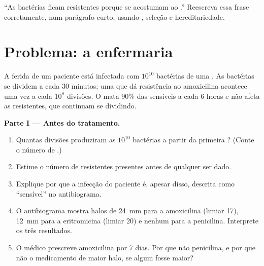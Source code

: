 \begin{exercise}[$\star\star\star$]\label{exo:g11:antibiotic-resistance:15}
``As bactérias ficam resistentes porque se acostumam ao .''
Reescreva essa frase corretamente, num parágrafo curto, usando ,
seleção e hereditariedade.
\end{exercise}

\section{Problema: a enfermaria}

\begin{problem}
\label{pb:g11:antibiotic-resistance:1}
A ferida de um paciente está infectada com $10^{10}$ bactérias de uma
. As bactérias se dividem a cada 30 minutos; uma  que dá
resistência ao  amoxicilina acontece uma vez a cada $10^8$
divisões. O  mata 90\% das  sensíveis a cada 6 horas
e não afeta as  resistentes, que continuam se dividindo.

\medskip
\noindent\textbf{Parte I --- Antes do tratamento.}
\begin{enumerate}
  \item Quantas divisões produziram as $10^{10}$ bactérias a partir da
        primeira ? (Conte o número de .)
  \item Estime o número de  resistentes presentes antes de
        qualquer  ser dado.
  \item Explique por que a infecção do paciente é, apesar disso,
        descrita como ``sensível'' no antibiograma.
  \item O antibiograma mostra halos de \qty{24}{mm} para a amoxicilina
        (limiar 17), \qty{12}{mm} para a eritromicina (limiar 20) e
        nenhum para a penicilina. Interprete os três resultados.
  \item O médico prescreve amoxicilina por 7 dias. Por que não
        penicilina, e por que não o medicamento de maior halo, se
        algum fosse maior?
\end{enumerate}


\end{problem}
